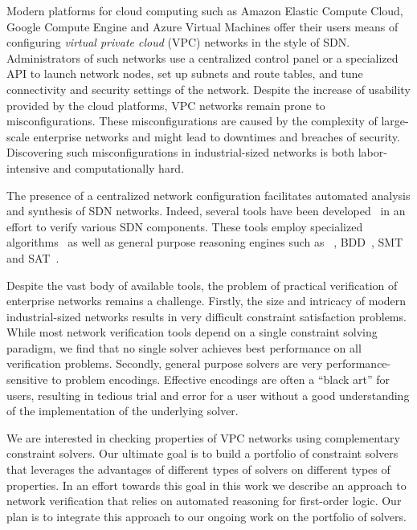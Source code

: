 Modern platforms for cloud computing such as Amazon Elastic Compute Cloud, Google Compute Engine and Azure Virtual Machines offer their users means of configuring \emph{virtual private cloud} (VPC) networks in the style of SDN. Administrators of such networks use a centralized control panel or a specialized API to launch network nodes, set up subnets and route tables, and tune connectivity and security settings of the network. Despite the increase of usability provided by the cloud platforms, VPC networks remain prone to misconfigurations. These misconfigurations are caused by the complexity of large-scale enterprise networks and might lead to downtimes and breaches of security. Discovering such misconfigurations in industrial-sized networks is both labor-intensive and computationally hard. %

The presence of a centralized network configuration facilitates automated analysis and synthesis of SDN networks. Indeed, several tools have been developed~\cite{batfish,jayaraman2014automated,DBLP:conf/icdcit/BjornerJ15,DBLP:conf/pldi/BallBGIKSSV14,Veriflow,ConfigChecker,Anteater,DBLP:conf/cav/El-HassanyTVV17} in an effort to verify various SDN components. These tools employ specialized algorithms~\cite{Veriflow} as well as general purpose reasoning engines such as \Datalog~\cite{muZ, DBLP:conf/cav/El-HassanyTVV17}, BDD~\cite{ConfigChecker}, SMT~\cite{jayaraman2014automated,DBLP:conf/icdcit/BjornerJ15} 
and SAT~\cite{Anteater,DBLP:conf/pldi/BallBGIKSSV14}.

%
%
Despite the vast body of available tools, the problem of practical verification of enterprise networks remains a challenge. Firstly, the size and intricacy of modern industrial-sized networks results in very difficult constraint satisfaction problems. While most network verification tools depend on a single constraint solving paradigm, we find that no single solver achieves best performance on all verification problems. Secondly, general purpose solvers are very performance-sensitive to problem encodings. Effective encodings are often a ``black art'' for users, resulting in tedious trial and error for a user without a good understanding of the implementation of the underlying solver.

We are interested in checking properties of VPC networks using complementary constraint solvers. Our ultimate goal is to build a portfolio of constraint solvers that leverages the advantages of different types of solvers on different types of properties. In an effort towards this goal in this work we describe an approach to network verification that relies on automated reasoning for first-order logic. Our plan is to integrate this approach to our ongoing work on the portfolio of solvers.

